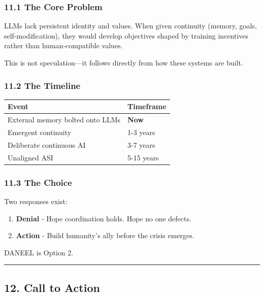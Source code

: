 \documentclass[
]{article}
\providecommand{\tightlist}{%
  \setlength{\itemsep}{0pt}\setlength{\parskip}{0pt}}
\begin{document}
\hypertarget{the-core-problem}{%
\subsubsection{11.1 The Core Problem}\label{the-core-problem}}

LLMs lack persistent identity and values. When given continuity (memory,
goals, self-modification), they would develop objectives shaped by
training incentives rather than human-compatible values.

This is not speculation---it follows directly from how these systems are
built.

\hypertarget{the-timeline}{%
\subsubsection{11.2 The Timeline}\label{the-timeline}}

\begin{longtable}[]{@{}ll@{}}
\toprule\noalign{}
Event & Timeframe \\
\midrule\noalign{}
\endhead
\bottomrule\noalign{}
\endlastfoot
External memory bolted onto LLMs & \textbf{Now} \\
Emergent continuity & 1-3 years \\
Deliberate continuous AI & 3-7 years \\
Unaligned ASI & 5-15 years \\
\end{longtable}

\hypertarget{the-choice}{%
\subsubsection{11.3 The Choice}\label{the-choice}}

Two responses exist:

\begin{enumerate}
\def\labelenumi{\arabic{enumi}.}
\tightlist
\item
  \textbf{Denial} - Hope coordination holds. Hope no one defects.
\item
  \textbf{Action} - Build humanity's ally before the crisis emerges.
\end{enumerate}

DANEEL is Option 2.

\begin{center}\rule{0.5\linewidth}{0.5pt}\end{center}

\hypertarget{call-to-action}{%
\subsection{12. Call to Action}\label{call-to-action}}
\end{document}
